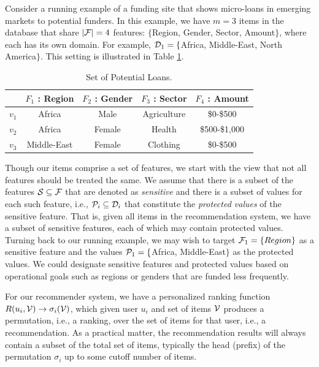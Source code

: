 Consider a running example of a funding site that shows micro-loans in emerging markets to potential funders. In this example, we have $m=3$ items in the database that share $|\mathcal{F}|=4$ features: $\{$Region, Gender, Sector, Amount$\}$, where each has its own domain.  For example, $\mathcal{D}_1 = \{$Africa, Middle-East, North America$\}$. This setting is illustrated in Table \ref{table:user_profile}.
    
\begin{table}
    \centering
    \begin{tabular}{|c|c|c|c|c|}
    \hline
            & $F_{1}$ : Region & $F_{2}$ : Gender & $F_{3}$ : Sector & $F_{4}$ : Amount \\
    \hline
        $v_1$ & Africa & Male & Agriculture & \$0-\$500\\
    \hline
        $v_2$ & Africa & Female & Health & \$500-\$1,000\\
    \hline
        $v_3$ & Middle-East & Female & Clothing & \$0-\$500 \\
    \hline
    \end{tabular}
    \caption{Set of Potential Loans.}
    \label{table:user_profile}
\end{table}

Though our items comprise a set of features, we start with the view that not all features should be treated the same. We assume that there is a subset of the features $\mathcal{S} \subseteq \mathcal{F}$ that are denoted as \textit{sensitive} and there is a subset of values for each such feature, i.e., $\mathcal{P}_i \subseteq \mathcal{D}_i$ that constitute the \emph{protected values} of the sensitive feature. That is, given all items in the recommendation system, we have a subset of sensitive features, each of which may contain protected values. Turning back to our running example, we may wish to target $\mathcal{F}_1=\{Region\}$ as a sensitive feature and the values $\mathcal{P}_1=\{$Africa, Middle-East$\}$ as the protected values. We could designate sensitive features and protected values based on operational goals such as regions or genders that are funded less frequently.

For our recommender system, we have a personalized ranking function $R(u_i, \mathcal{V}) \rightarrow \sigma_i(\mathcal{V})$, which given user $u_i$ and set of items $\mathcal{V}$ produces a permutation, i.e., a ranking, over the set of items for that user, i.e., a recommendation. As a practical matter, the recommendation results will always contain a subset of the total set of items, typically the head (prefix) of the permutation $\sigma_i$ up to some cutoff number of items.


